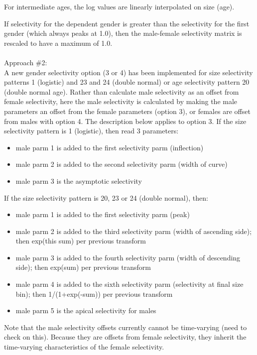 For intermediate ages, the log values are linearly interpolated on size (age).

If selectivity for the dependent gender is greater than the selectivity for the first gender (which always peaks at 1.0), then the male-female selectivity matrix is rescaled to have a maximum of 1.0.\\
\\
Approach \#2:\\
A new gender selectivity option (3 or 4) has been implemented for size selectivity patterns 1 (logistic) and 23 and 24 (double normal) or age selectivity pattern 20 (double normal age).  Rather than calculate male selectivity as an offset from female selectivity, here the male selectivity is calculated by making the male parameters an offset from the female parameters (option 3), or females are offset from males with option 4.  The description below applies to option 3. If the size selectivity pattern is 1 (logistic), then read 3 parameters:
\begin{itemize}
	\item male parm 1 is added to the first selectivity parm (inflection)
	\item male parm 2 is added to the second selectivity parm (width of curve)
	\item male parm 3 is the asymptotic selectivity
\end{itemize}

If the size selectivity pattern is 20, 23 or 24 (double normal), then:
\begin{itemize}
	\item male parm 1 is added to the first selectivity parm (peak)
	\item male parm 2 is added to the third selectivity parm (width of ascending side); then exp(this sum) per previous transform
	\item male parm 3 is added to the fourth selectivity parm (width of descending side); then exp(sum) per previous transform
	\item male parm 4 is added to the sixth selectivity parm (selectivity at final size bin); then 1/(1+exp(-sum)) per previous transform
	\item male parm 5 is the apical selectivity for males
\end{itemize}

Note that the male selectivity offsets currently cannot be time-varying (need to check on this).  Because they are offsets from female selectivity, they inherit the time-varying characteristics of the female selectivity.


